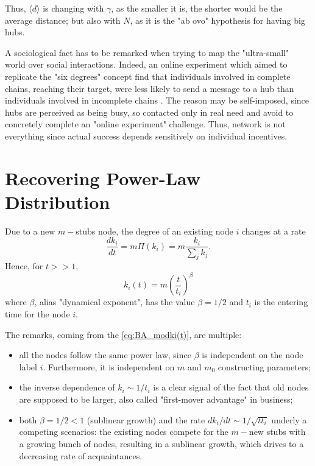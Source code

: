 \documentclass[a4paper,10pt, oneside]{book} %
\theoremstyle{definition}
\begin{document}
Thus, \(\langle d \rangle\) is changing with $\gamma$, as the smaller it is, the shorter would be the average distance; but also with $N$, as it is the "ab ovo" hypothesis for having big hubs.

A sociological fact has to be remarked when trying to map the "ultra-small" world over social interactions. Indeed, an online experiment which aimed to replicate the "six degrees" concept find that individuals involved in complete chains, reaching their target, were less likely to send a message to a hub than individuals involved in incomplete chains \cite{Dodds:2003_GSonlineNet_6deg}. The reason may be self-imposed, since hubs are perceived as being busy, so contacted only in real need and avoid to concretely complete an "online experiment" challenge. Thus, network is not everything since actual success depends sensitively on individual incentives.


\newpage
\section{Recovering Power-Law Distribution}
\label{App:RecPLD}
Due to a new $m-$stubs node, the degree of an existing node $i$ changes at a rate
\begin{equation}
	\frac{dk_i}{dt} = m \Pi(k_i) = m \frac{k_i}{\sum_j k_j}
	\label{eq:BA_dk_i/dt}
	.
\end{equation}
Hence, for $t >> 1$, 
\begin{equation}
	k_i(t) = m \left(\frac{t}{t_i}\right)^\beta
	\label{eq:BA_modki(t)}
\end{equation}
where $\beta$, alias \label{cit:SaraSagone3} "dynamical exponent", has the value $\beta = 1/2$ \cite{barabasi::2016networkbook} and $t_i$ is the entering time for the node $i$.

The remarks, coming from the \autoref{eq:BA_modki(t)}, are multiple:
\begin{itemize}
	\item all the nodes follow the same power law, since $\beta$ is independent on the node label $i$. Furthermore, it is independent on $m$ and $m_0$ constructing parameters;
	\item the inverse dependence of $k_i \sim 1/t_i$ is a clear signal of the fact that old nodes are supposed to be larger, also called "first-mover advantage" in business;
	\item both $\beta = 1/2 < 1$ (sublinear growth) and the rate $dk_i/dt \sim 1/\sqrt{tt_i}$ underly a competing scenarios: the existing nodes compete for the $m-$new stubs with a growing bunch of nodes, resulting in a sublinear growth, which drives to a decreasing rate of acquaintances. 
\end{itemize}
\end{document}
